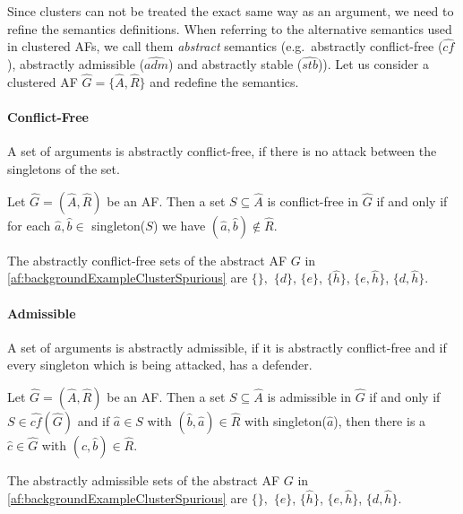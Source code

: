 Since clusters can not be treated the exact same way as an argument, we need to refine the semantics definitions. When referring to the alternative semantics used in clustered AFs, we call them \emph{abstract} semantics (e.g.\ abstractly conflict-free ($\hat{cf}$), abstractly admissible ($\hat{adm}$) and abstractly stable ($\hat{stb}$)). Let us consider a clustered AF $\hat{G}=\{\hat{A}, \hat{R}\}$ and redefine the semantics.

\paragraph{Conflict-Free} A set of arguments is abstractly conflict-free, if there is no attack between the singletons of the set.

\begin{definition}
    Let $\hat{G}=(\hat{A},\hat{R})$ be an AF. Then a set  $S \subseteq \hat{A}$ is conflict-free in $\hat{G}$ if and only if for each $\hat{a}, \hat{b} \in$ singleton($S$) we have $(\hat{a}, \hat{b}) \not\in \hat{R}$.
\end{definition}

\begin{example}
    The abstractly conflict-free sets of the abstract AF $G$ in \cref{af:backgroundExampleClusterSpurious} are 
    $\{\},$
    $\{d\}$,
    $\{e\}$,
    $\{\hat{h}\}$,
    $\{e, \hat{h}\}$,
    $\{d, \hat{h}\}$.
\end{example}




\paragraph{Admissible} A set of arguments is abstractly admissible, if it is abstractly conflict-free and if every singleton which is being attacked, has a defender.

\begin{definition}
    Let $\hat{G}=(\hat{A},\hat{R})$ be an AF. Then a set  $S \subseteq \hat{A}$ is admissible in $\hat{G}$ if and only if $S \in \hat{cf}(\hat{G})$ and if $\hat{a} \in S$ with $(\hat{b}, \hat{a}) \in \hat{R}$ with singleton($\hat{a}$), then there is a $\hat{c} \in \hat{G}$ with $(\hat{c}, \hat{b}) \in \hat{R}$.
\end{definition}
\begin{example}
    The abstractly admissible sets of the abstract AF $G$ in \cref{af:backgroundExampleClusterSpurious} are $\{\},$
    $\{e\}$,
    $\{\hat{h}\}$,
    $\{e, \hat{h}\}$,
    $\{d, \hat{h}\}$.
\end{example}





